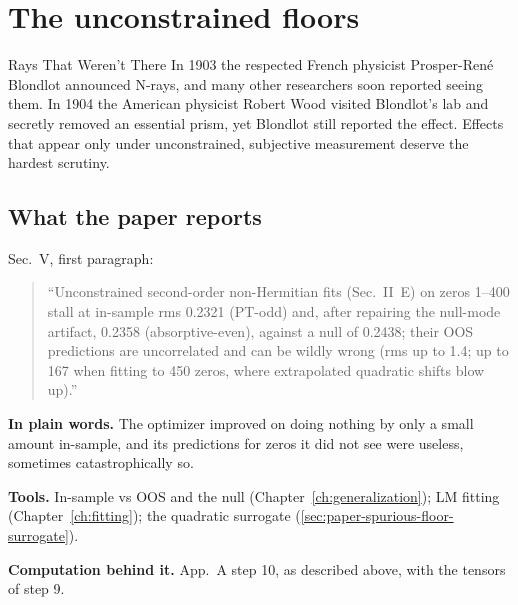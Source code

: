 \section{The unconstrained floors}\label{sec:paper-spurious-floor-floors}
\begin{didyouknow}{Rays That Weren't There}
In 1903 the respected French physicist Prosper-Ren\'e Blondlot announced N-rays, and many other researchers soon reported seeing them. In 1904 the American physicist Robert Wood visited Blondlot's lab and secretly removed an essential prism, yet Blondlot still reported the effect. Effects that appear only under unconstrained, subjective measurement deserve the hardest scrutiny.
\end{didyouknow}

\subsection{What the paper reports}

Sec.~V, first paragraph:

\begin{quote}
``Unconstrained second-order non-Hermitian fits (Sec.~II~E) on zeros 1--400 stall at in-sample rms 0.2321 (PT-odd) and, after repairing the null-mode artifact, 0.2358 (absorptive-even), against a null of 0.2438; their OOS predictions are uncorrelated and can be wildly wrong (rms up to 1.4; up to 167 when fitting to 450 zeros, where extrapolated quadratic shifts blow up).''
\end{quote}

\textbf{In plain words.} The optimizer improved on doing nothing by only a small amount in-sample, and its predictions for zeros it did not see were useless, sometimes catastrophically so.

\textbf{Tools.} In-sample vs OOS and the null (Chapter~\ref{ch:generalization}); LM fitting (Chapter~\ref{ch:fitting}); the quadratic surrogate (\cref{sec:paper-spurious-floor-surrogate}).

\textbf{Computation behind it.} App.~A step 10, as described above, with the tensors of step 9.

